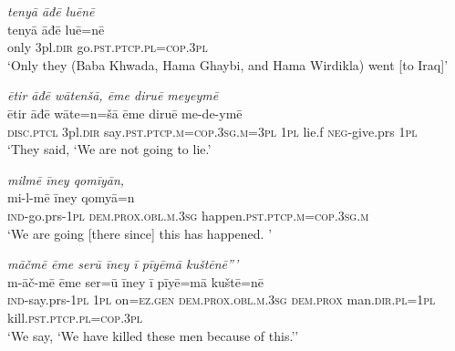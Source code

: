 \ea \label{BP.116}
\textit{tenyā āđē luēnē} \\ 
\gll tenyā āđē luē=nē \\ 
 only 3pl\textsc{.dir} go\textsc{.pst}\textsc{.ptcp}\textsc{.pl}\textsc{=cop}\textsc{.3pl} \\ 
\glt `Only they (Baba Khwada, Hama Ghaybi, and Hama Wirdikla) went [to Iraq]'
\z 
 
\ea \label{BP.117}
\textit{ētir āđē wātenšā, ēme diruē meyeymē} \\ 
\gll ētir āđē wāte=n=šā ēme diruē me-de-ymē \\ 
 \textsc{disc.ptcl} 3pl\textsc{.dir} say\textsc{.pst}\textsc{.ptcp}\textsc{.m}\textsc{=cop}\textsc{.3sg}\textsc{.m}\textsc{=3pl} \textsc{1pl} lie.f \textsc{neg-}give.prs \textsc{1pl} \\ 
\glt `They said, ‘We are not going to lie.'
\z 
 
\ea \label{BP.119}
\textit{milmē īney qomīyān,} \\ 
\gll mi-l-mē īney qomyā=n \\ 
 \textsc{ind-}go.prs\textsc{-\textsc{1pl}} \textsc{dem.prox}\textsc{.obl}\textsc{.m}\textsc{.3sg} happen\textsc{.pst}\textsc{.ptcp}\textsc{.m}\textsc{=cop}\textsc{.3sg}\textsc{.m} \\ 
\glt `We are going [there since] this has happened. '
\z 
 
\ea \label{BP.121}
\textit{māčmē ēme serū īney ī pīyēmā kuštēnē”’} \\ 
\gll m-āč-mē ēme ser=ū īney ī pīyē=mā kuštē=nē \\ 
 \textsc{ind-}say.prs\textsc{-\textsc{1pl}} \textsc{1pl} on\textsc{=ez.gen} \textsc{dem.prox}\textsc{.obl}\textsc{.m}\textsc{.3sg} \textsc{dem.prox} man\textsc{.dir}\textsc{.pl}\textsc{=\textsc{1pl}} kill\textsc{.pst}\textsc{.ptcp}\textsc{.pl}\textsc{=cop}\textsc{.3pl} \\ 
\glt `We say, ‘We have killed these men because of this.’'
\z 
 
